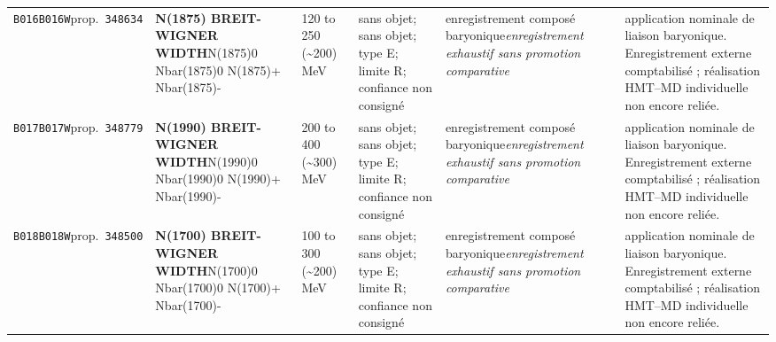 \begin{landscape}
\begin{longtable}{L{1.85cm}L{4.45cm}L{2.35cm}L{4.05cm}L{3.35cm}L{7.15cm}}
\texttt{B016}\newline \texttt{B016W}\newline prop.\ \texttt{348634} & \textbf{N(1875) BREIT-WIGNER WIDTH}\newline N(1875)0 \textbar{}\allowbreak{} Nbar(1875)0 \textbar{}\allowbreak{} N(1875)+ \textbar{}\allowbreak{} Nbar(1875)- & 120 to 250 (\textasciitilde{}200)\,MeV & sans objet; sans objet; type E; limite R; confiance non consigné & enregistrement composé baryonique\newline \emph{enregistrement exhaustif sans promotion comparative} & application nominale de liaison baryonique. Enregistrement externe comptabilisé ; réalisation HMT--MD individuelle non encore reliée. \\
\texttt{B017}\newline \texttt{B017W}\newline prop.\ \texttt{348779} & \textbf{N(1990) BREIT-WIGNER WIDTH}\newline N(1990)0 \textbar{}\allowbreak{} Nbar(1990)0 \textbar{}\allowbreak{} N(1990)+ \textbar{}\allowbreak{} Nbar(1990)- & 200 to 400 (\textasciitilde{}300)\,MeV & sans objet; sans objet; type E; limite R; confiance non consigné & enregistrement composé baryonique\newline \emph{enregistrement exhaustif sans promotion comparative} & application nominale de liaison baryonique. Enregistrement externe comptabilisé ; réalisation HMT--MD individuelle non encore reliée. \\
\texttt{B018}\newline \texttt{B018W}\newline prop.\ \texttt{348500} & \textbf{N(1700) BREIT-WIGNER WIDTH}\newline N(1700)0 \textbar{}\allowbreak{} Nbar(1700)0 \textbar{}\allowbreak{} N(1700)+ \textbar{}\allowbreak{} Nbar(1700)- & 100 to 300 (\textasciitilde{}200)\,MeV & sans objet; sans objet; type E; limite R; confiance non consigné & enregistrement composé baryonique\newline \emph{enregistrement exhaustif sans promotion comparative} & application nominale de liaison baryonique. Enregistrement externe comptabilisé ; réalisation HMT--MD individuelle non encore reliée. \\

\end{longtable}
\end{landscape}
